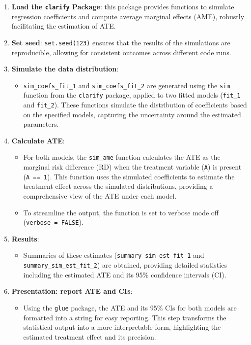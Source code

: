 \documentclass[
  singlecolumn]{article}
\providecommand{\tightlist}{%
  \setlength{\itemsep}{0pt}\setlength{\parskip}{0pt}}\usepackage{longtable,booktabs,array}
\begin{document}
\begin{enumerate}
\def\labelenumi{\arabic{enumi}.}
\item
  \textbf{Load the \texttt{clarify} Package}: this package provides
  functions to simulate regression coefficients and compute average
  marginal effects (AME), robustly facilitating the estimation of ATE.
\item
  \textbf{Set seed}: \texttt{set.seed(123)} ensures that the results of
  the simulations are reproducible, allowing for consistent outcomes
  across different code runs.
\item
  \textbf{Simulate the data distribution}:

  \begin{itemize}
  \tightlist
  \item
    \texttt{sim\_coefs\_fit\_1} and \texttt{sim\_coefs\_fit\_2} are
    generated using the \texttt{sim} function from the \texttt{clarify}
    package, applied to two fitted models (\texttt{fit\_1} and
    \texttt{fit\_2}). These functions simulate the distribution of
    coefficients based on the specified models, capturing the
    uncertainty around the estimated parameters.
  \end{itemize}
\item
  \textbf{Calculate ATE}:

  \begin{itemize}
  \tightlist
  \item
    For both models, the \texttt{sim\_ame} function calculates the ATE
    as the marginal risk difference (RD) when the treatment variable
    (\texttt{A}) is present (\texttt{A\ ==\ 1}). This function uses the
    simulated coefficients to estimate the treatment effect across the
    simulated distributions, providing a comprehensive view of the ATE
    under each model.
  \item
    To streamline the output, the function is set to verbose mode off
    (\texttt{verbose\ =\ FALSE}).
  \end{itemize}
\item
  \textbf{Results}:

  \begin{itemize}
  \tightlist
  \item
    Summaries of these estimates (\texttt{summary\_sim\_est\_fit\_1} and
    \texttt{summary\_sim\_est\_fit\_2}) are obtained, providing detailed
    statistics including the estimated ATE and its 95\% confidence
    intervals (CI).
  \end{itemize}
\item
  \textbf{Presentation: report ATE and CIs}:

  \begin{itemize}
  \tightlist
  \item
    Using the \texttt{glue} package, the ATE and its 95\% CIs for both
    models are formatted into a string for easy reporting. This step
    transforms the statistical output into a more interpretable form,
    highlighting the estimated treatment effect and its precision.
  \end{itemize}
\end{enumerate}
\end{document}
